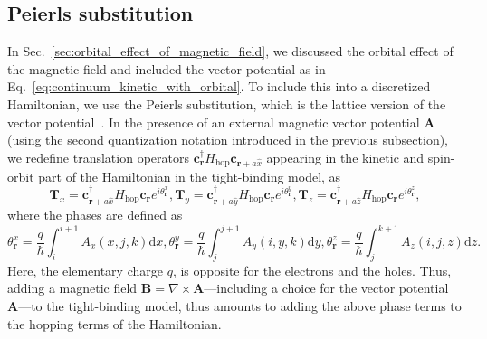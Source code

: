 \subsection{Peierls substitution}
In Sec.~\ref{sec:orbital_effect_of_magnetic_field}, we discussed the orbital effect of the magnetic field and included the vector potential as in Eq.~\eqref{eq:continuum_kinetic_with_orbital}.
To include this into a discretized Hamiltonian, we use the Peierls substitution, which is the lattice version of the vector potential~\cite{Peierls1933}.
In the presence of an external magnetic vector potential $\mathbf{A}$ (using the second quantization notation introduced in the previous subsection), we redefine translation operators $\bm{c}_{\bm{r}}^{\dagger}H_\textrm{hop}\bm{c}_{\bm{r}+a\hat{x}}$ appearing in the kinetic and spin-orbit part of the Hamiltonian in the tight-binding model, as
\begin{subequations}
\begin{equation}
\bm{T}_x = \bm{c}_{\bm{r}+a\hat{x}}^{\dagger}H_\textrm{hop}\bm{c}_{\bm{r}} e^{i \theta_{\bm{r}}^x},
\end{equation}
\begin{equation}
\bm{T}_y = \bm{c}_{\bm{r}+a\hat{y}}^{\dagger}H_\textrm{hop}\bm{c}_{\bm{r}} e^{i \theta_{\bm{r}}^y},
\end{equation}
\begin{equation}
\bm{T}_z = \bm{c}_{\bm{r}+a\hat{z}}^{\dagger}H_\textrm{hop}\bm{c}_{\bm{r}} e^{i \theta_{\bm{r}}^z},
\end{equation}
\end{subequations}
where the phases are defined as
\begin{subequations}
\begin{equation}
\theta_{\bm{r}}^{x}={\frac {q}{\hbar}} \int_{i}^{i+1}A_{x}(x,j,k){\text{d}}x,
\end{equation}
\begin{equation}
\theta_{\bm{r}}^{y}={\frac {q}{\hbar}} \int_{j}^{j+1}A_{y}(i,y,k){\text{d}}y,
\end{equation}
\begin{equation}
\theta_{\bm{r}}^{z}={\frac {q}{\hbar}} \int_{j}^{k+1}A_{z}(i,j,z){\text{d}}z.
\end{equation}
\end{subequations}
Here, the elementary charge $q$, is opposite for the electrons and the holes.
Thus, adding a magnetic field $\bm{B}=\nabla \times \bm{A}$---including a choice for the vector potential $\bm{A}$---to the tight-binding model, thus amounts to adding the above phase terms to the hopping terms of the Hamiltonian.


